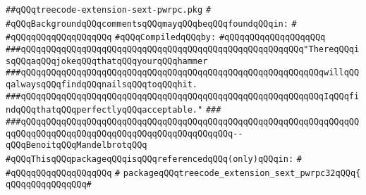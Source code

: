 \label{src/lib/compiler/back/low/pwrpc32/code/treecode-extension-sext-pwrpc.pkg}
\verb|##qQQqtreecode-extension-sext-pwrpc.pkg|\newline
\verb|#|\newline
\verb|#qQQqBackgroundqQQqcommentsqQQqmayqQQqbeqQQqfoundqQQqin:|\newline
\verb|#|\newline
\verb|#qQQqqQQqqQQqqQQqqQQq|\newline
\newline
\verb|#qQQqCompiledqQQqby:|\newline
\verb|#qQQqqQQqqQQqqQQqqQQq|\newline
\newline
\newline
\newline
\verb|###qQQqqQQqqQQqqQQqqQQqqQQqqQQqqQQqqQQqqQQqqQQqqQQqqQQqqQQq"ThereqQQqisqQQqaqQQqjokeqQQqthatqQQqyourqQQqhammer|\newline
\verb|###qQQqqQQqqQQqqQQqqQQqqQQqqQQqqQQqqQQqqQQqqQQqqQQqqQQqqQQqqQQqwillqQQqalwaysqQQqfindqQQqnailsqQQqtoqQQqhit.|\newline
\verb|###qQQqqQQqqQQqqQQqqQQqqQQqqQQqqQQqqQQqqQQqqQQqqQQqqQQqqQQqqQQqIqQQqfindqQQqthatqQQqperfectlyqQQqacceptable."|\newline
\verb|###|\newline
\verb|###qQQqqQQqqQQqqQQqqQQqqQQqqQQqqQQqqQQqqQQqqQQqqQQqqQQqqQQqqQQqqQQqqQQqqQQqqQQqqQQqqQQqqQQqqQQqqQQqqQQqqQQqqQQqqQQq--qQQqBenoitqQQqMandelbrotqQQq|\newline
\newline
\newline
\verb|#qQQqThisqQQqpackageqQQqisqQQqreferencedqQQq(only)qQQqin:|\newline
\verb|#|\newline
\verb|#qQQqqQQqqQQqqQQqqQQq|\newline
\verb|#|\newline
\verb|packageqQQqtreecode_extension_sext_pwrpc32qQQq{|\newline
\verb|qQQqqQQqqQQqqQQq#|\newline
